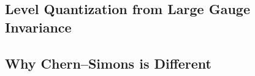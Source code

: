 \subsection{Level Quantization from Large Gauge Invariance}
\label{subsec:level-quantization}


\subsection{Why Chern--Simons is Different}
\label{subsec:cs-distinction}


